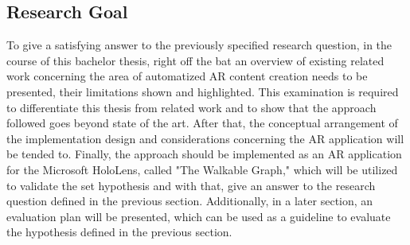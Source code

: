 \documentclass[12pt,a4paper,oneside,american,parskip=half]{article}
\begin{document}
\begin{justify}
\begin{normalsize}
\subsection{Research Goal}
To give a satisfying answer to the previously specified research question, in the course of this bachelor thesis, right off the bat an overview of existing related work concerning the area of automatized AR content creation needs to be presented, their limitations shown and highlighted. This examination is required to differentiate this thesis from related work and to show that the approach followed goes beyond state of the art.
\newline
After that, the conceptual arrangement of the implementation design and considerations concerning the AR application will be tended to. Finally, the approach should be implemented as an AR application for the Microsoft HoloLens, called "The Walkable Graph," which will be utilized to validate the set hypothesis and with that, give an answer to the research question defined in the previous section. Additionally, in a later section, an evaluation plan will be presented, which can be used as a guideline to evaluate the hypothesis defined in the previous section.

\clearpage

\end{normalsize}
\end{justify}
\end{document}
